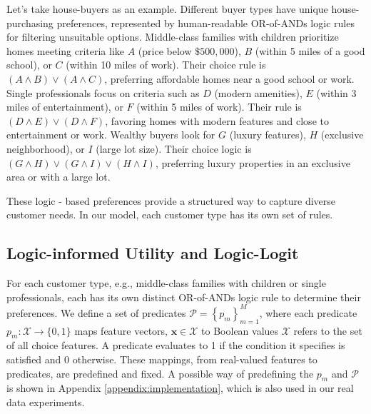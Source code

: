 \documentclass{article} %
\begin{document}
%
%
%

%

Let's take house-buyers as an example. Different buyer types have unique house-purchasing preferences, represented by human-readable OR-of-ANDs logic rules for filtering unsuitable options. Middle-class families with children prioritize homes meeting criteria like \(A\) (price below $\$ 500,000$), \(B\) (within 5 miles of a good school), or \(C\) (within 10 miles of work). Their choice rule is \((A \wedge B) \vee(A \wedge C)\), preferring affordable homes near a good school or work. Single professionals focus on criteria such as \(D\) (modern amenities), \(E\) (within 3 miles of entertainment), or \(F\) (within 5 miles of work). Their rule is \((D \wedge E) \vee (D \wedge F)\), favoring homes with modern features and close to entertainment or work. Wealthy buyers look for \(G\) (luxury features), \(H\) (exclusive neighborhood), or \(I\) (large lot size). Their choice logic is \((G \wedge H) \vee (G \wedge I) \vee (H \wedge I)\), preferring luxury properties in an exclusive area or with a large lot.

These logic - based preferences provide a structured way to capture diverse customer needs. In our model, each customer type has its own set of rules. 


\subsection{Logic-informed Utility and Logic-Logit}\label{sec: logic-logit}

For each customer type, e.g., middle-class families with children or single professionals, each has its own distinct OR-of-ANDs logic rule to determine their preferences.
We define a set of predicates $\mathcal{P}=\left\{p_m\right\}_{m=1}^M$, where each predicate $p_m: \mathcal{X} \rightarrow\{0,1\}$ maps feature vectors, $\boldsymbol{x} \in \mathcal{X}$ to Boolean values $\mathcal{X}$ refers to the set of all choice features. A predicate evaluates to 1 if the condition it specifies is satisfied and 0 otherwise. These mappings, from real-valued features to predicates, are predefined and fixed. A possible way of predefining the $p_m$ and $\mathcal{P}$ is shown in Appendix \ref{appendix:implementation}, which is also used in our real data experiments.
\end{document}
